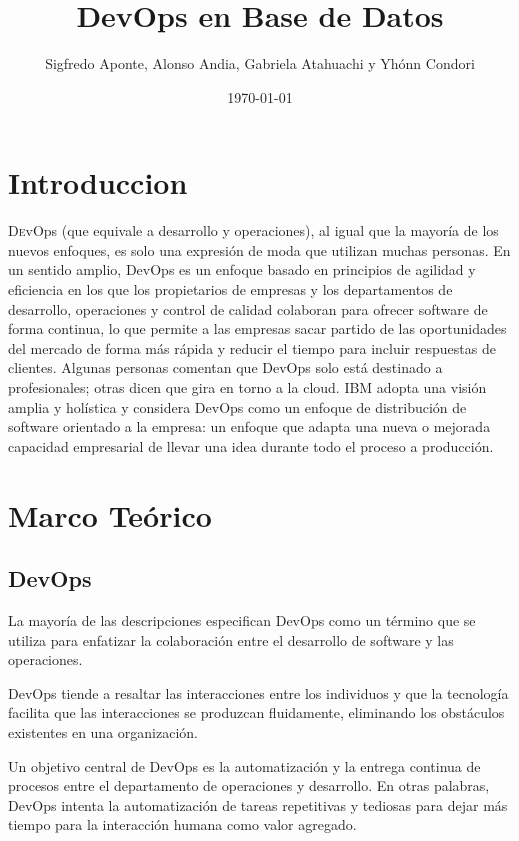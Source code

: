 \documentclass[twoside,twocolumn]{article}
\title{DevOps en Base de Datos} %
\author{Sigfredo Aponte, Alonso Andia, Gabriela Atahuachi y Yhónn Condori}
\date{\today} %
\begin{document}
\maketitle
\section{Introduccion}
\lettrine[nindent=0em,lines=3]{D}evOps (que equivale a desarrollo y operaciones), al igual que la mayoría de los nuevos enfoques, es solo una expresión de moda que utilizan muchas personas. En un sentido amplio, DevOps es un enfoque basado en principios de agilidad y eficiencia en los que los propietarios de empresas y los departamentos de desarrollo, operaciones y control de calidad colaboran para ofrecer software de forma continua, lo que permite a las empresas sacar partido de las oportunidades del mercado de forma más rápida y reducir el tiempo para incluir respuestas de clientes.
Algunas personas comentan que DevOps solo está destinado a profesionales; otras dicen que gira en torno a la cloud. IBM adopta una visión amplia y holística y considera DevOps como un enfoque de distribución de software orientado a la empresa: un enfoque que adapta una nueva o mejorada capacidad empresarial de llevar una idea durante todo el proceso a producción. 




\section{Marco Teórico}

\subsection{DevOps}

La mayoría de las descripciones especifican DevOps como un término que se utiliza para enfatizar la colaboración entre el desarrollo de software y las operaciones.

DevOps tiende a resaltar las interacciones entre los individuos y que la tecnología facilita que las interacciones se produzcan fluidamente, eliminando los obstáculos existentes en una organización.

Un objetivo central de DevOps es la automatización y la entrega continua de procesos entre el departamento de operaciones y desarrollo. En otras palabras, DevOps intenta la automatización de tareas repetitivas y tediosas para dejar más tiempo para la interacción humana como valor agregado.
\end{document}
